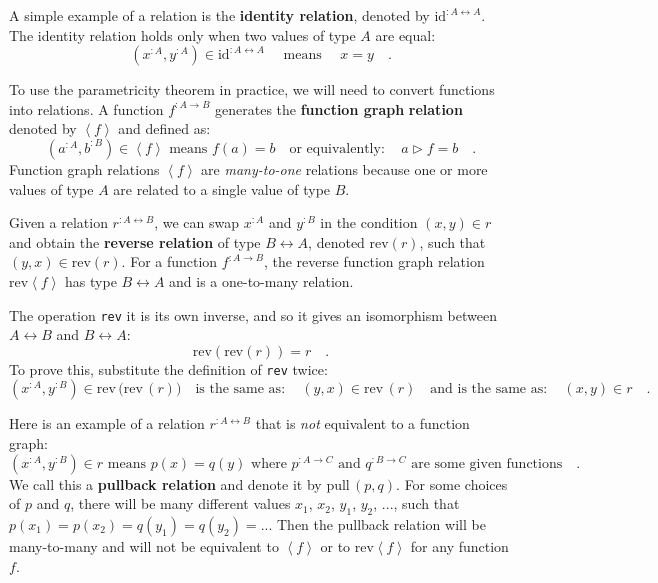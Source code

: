 A simple example of a relation is the \textbf{identity relation},
denoted by $\text{id}^{:A\leftrightarrow A}$. The identity relation
holds only when two values of type $A$ are equal:
\[
(x^{:A},y^{:A})\in\text{id}^{:A\leftrightarrow A}\quad\text{ means }\quad x=y\quad.
\]

To use the parametricity theorem in practice, we will need to convert
functions into relations. A function $f^{:A\rightarrow B}$ generates
the \textbf{function graph} \textbf{relation}
denoted by $\left<f\right>$ and defined as:
\[
(a^{:A},b^{:B})\in\left<f\right>\text{ means }f(a)=b\quad\text{or equivalently}:\quad a\triangleright f=b\quad.
\]
Function graph relations $\left<f\right>$ are \emph{many-to-one}
relations because one or more values of type $A$ are related to a
single value of type $B$.

Given a relation $r^{:A\leftrightarrow B}$, we can swap $x^{:A}$
and $y^{:B}$ in the condition $(x,y)\in r$ and obtain the \textbf{reverse
relation} of type $B\leftrightarrow A$, denoted $\text{rev}\left(r\right)$,
such that $(y,x)\in\text{rev}\left(r\right)$. For a function $f^{:A\rightarrow B}$,
the reverse function graph relation $\text{rev}\left<f\right>$ has
type $B\leftrightarrow A$ and is a one-to-many relation. 

The operation \lstinline!rev! it is its own inverse, and so it gives
an isomorphism between $A\leftrightarrow B$ and $B\leftrightarrow A$:
\[
\text{rev}\left(\text{rev}\left(r\right)\right)=r\quad.
\]
To prove this, substitute the definition of \lstinline!rev! twice:
\[
(x^{:A},y^{:B})\in\text{rev}\,\big(\text{rev}\,(r)\big)\quad\text{is the same as}:\quad(y,x)\in\text{rev}\,(r)\quad\text{and is the same as}:\quad(x,y)\in r\quad.
\]

Here is an example of a relation $r^{:A\leftrightarrow B}$ that is
\emph{not} equivalent to a function graph:
\[
(x^{:A},y^{:B})\in r\text{ means }p(x)=q(y)\text{ where }p^{:A\rightarrow C}\text{ and }q^{:B\rightarrow C}\text{ are some given functions}\quad.
\]
We call this a \textbf{pullback relation}
and denote it by $\text{pull}\,(p,q)$. For some choices of $p$ and
$q$, there will be many different values $x_{1}$, $x_{2}$, $y_{1}$,
$y_{2}$, ..., such that $p(x_{1})=p(x_{2})=q(y_{1})=q(y_{2})=...$
Then the pullback relation will be many-to-many and will not be equivalent
to $\left<f\right>$ or to $\text{rev}\left<f\right>$ for any function
$f$. 


